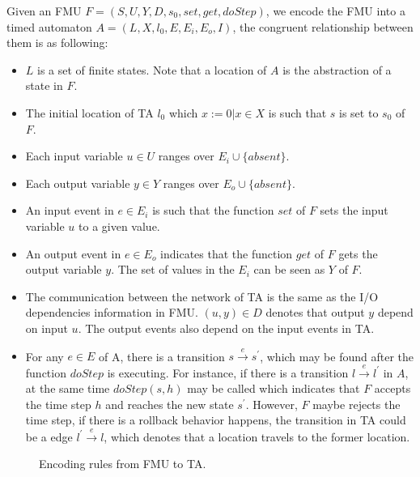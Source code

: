 Given an FMU $F=(S,U,Y,D,s_{0},set,get,doStep)$, we encode the FMU into a timed automaton $A = (L,X,l_{0},E,E_{i},E_{o},I)$, the congruent relationship between them is as following:
\begin{itemize}
\item
$L$ is a set of finite states. Note that a location of $A$ is the abstraction of a state in $F$.
\item
The initial location of TA $l_{0}$ which $x:=0 \vert x \in X$ is such that $s$ is set to $s_{0}$ of $F$. 
\item
Each input variable $u \in U$ ranges over $E_{i} \cup \{absent\}$.
\item
Each output variable $y \in Y$ ranges over $E_{o} \cup \{absent\}$.
\item
An input event in $e \in E_{i}$ is such that the function $set$ of $F$ sets the input variable $u$ to a given value. 
\item
An output event in $e \in E_{o}$ indicates that the function $get$ of $F$ gets the output variable $y$. The set of values in the $E_{i}$ can be seen as $Y$ of $F$.  
\item
The communication between the network of TA is the same as the I/O dependencies information in FMU. $(u,y) \in D$ denotes that output $y$ depend on input $u$. The output events also depend on the input events in TA.
\item
For any $e \in E$ of A, there is a transition $s \xrightarrow{e} s^{\prime}$, which may be found after the function $doStep$ is executing. For instance, if there is a transition $l \xrightarrow{e} l^{\prime}$ in $A$, at the same time $doStep(s,h)$ may be called which indicates that $F$ accepts the time step $h$ and reaches the new state $s^{\prime}$. However, $F$ maybe rejects the time step, if there is a rollback behavior happens, the transition in TA could be a edge $l^{\prime} \xrightarrow{e} l$, which denotes that a location travels to the former location.

\end{itemize}
\begin{figure}[htbp]
	\caption{Encoding rules from FMU to TA.}
	\label{fmutota}
\end{figure}

